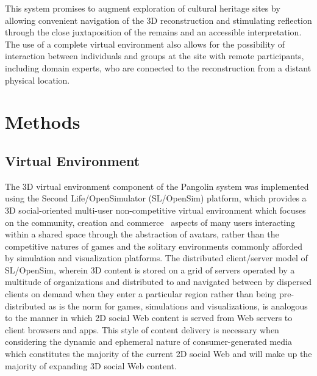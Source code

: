 

This system promises to augment exploration of cultural heritage sites by allowing convenient navigation of the 3D reconstruction and stimulating reflection through the close juxtaposition of the remains and an accessible interpretation. The use of a complete virtual environment also allows for the possibility of interaction between individuals and groups at the site with remote participants, including domain experts, who are connected to the reconstruction from a distant physical location.

\section{Methods}
\subsection{Virtual Environment}
The 3D virtual environment component of the Pangolin system was implemented using the Second Life/OpenSimulator (SL/OpenSim) platform, which provides a 3D social-oriented multi-user non-competitive virtual environment which focuses on the community, creation and commerce~\cite{Sevan2008} aspects of many users interacting within a shared space through the abstraction of avatars, rather than the competitive natures of games and the solitary environments commonly afforded by simulation and visualization platforms. The distributed client/server model of SL/OpenSim, wherein 3D content is stored on a grid of servers operated by a multitude of organizations and distributed to and navigated between by dispersed clients on demand when they enter a particular region rather than being pre-distributed as is the norm for games, simulations and visualizations, is analogous to the manner in which 2D social Web content is served from Web servers to client browsers and apps. This style of content delivery is necessary when considering the dynamic and ephemeral nature of consumer-generated media which constitutes the majority of the current 2D social Web and will make up the majority of expanding 3D social Web content.

